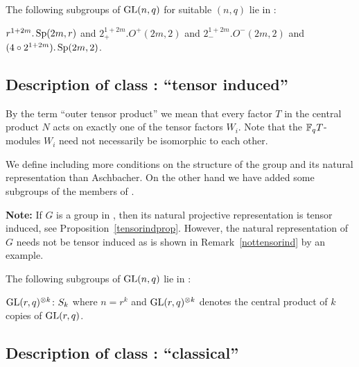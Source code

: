 \smallskip
\exmemb
The following subgroups of $\GL(n,q)$ for suitable $(n,q)$ lie in :

$r^{1+2m}.\Sp(2m,r)$ and $2_+^{1+2m}.O^+(2m,2)$ and 
$2_-^{1+2m}.O^-(2m,2)$ and $(4 \circ 2^{1+2m}).\Sp(2m,2)$.


\subsection{Description of class : ``tensor induced''}
\label{descD7}
%
%


By the term ``outer tensor product'' we mean that every factor
$T$ in the central product $N$ acts on exactly one of the tensor factors $W_i$.
Note that the $\mathbb{F}_q T$-modules $W_i$ need not necessarily be
isomorphic to each other.

\medskip
{} 
We define  including more conditions on the structure of the group
and its natural representation than Aschbacher. On the other hand we
have added some subgroups of the members of .

\smallskip
\textbf{Note:} 
If $G$ is a
group in , then its natural projective representation
is tensor induced,
see Proposition~\ref{tensorindprop}. However, the natural
representation of $G$ needs not be tensor induced as is shown in
Remark~\ref{nottensorind} by an example.

\smallskip
\exmemb
The following subgroups of $\GL(n,q)$ lie in :

$\GL(r,q)^{\otimes k}\colon S_k$ where $n=r^k$ and $\GL(r,q)^{\otimes k}$ 
denotes the central product of $k$ copies of $\GL(r,q)$.

\subsection{Description of class : ``classical''}
\label{descD8}
%
%

